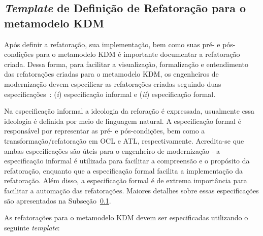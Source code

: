 \subsection{\textit{Template} de Definição de Refatoração para o metamodelo KDM}\label{sec:template_refatoracao}

Após definir a refatoração, sua implementação, bem como suas pré- e pós-condições para o metamodelo KDM é importante documentar a refatoração criada. Dessa forma, para facilitar a visualização, formalização e entendimento das refatorações criadas para o metamodelo KDM, os engenheiros de modernização devem especificar as refatorações criadas seguindo duas especificações~\cite{staron2004implementing}: (\textit{i}) especificação informal e (\textit{ii}) especificação formal. 

Na especificação informal a ideologia da reforação é expressada, usualmente essa ideologia é definida por meio de linguagem natural. A especificação formal é responsável por representar as pré- e pós-condições, bem como a transformação/refatoração em OCL e ATL, respectivamente. Acredita-se que ambas especificações são úteis para o engenheiro de modernização - a especificação informal é utilizada para facilitar a compreensão e o propósito da refatoração, enquanto que a especificação formal facilita a implementação da refatoração. Além disso, a especificação formal é de extrema importância para facilitar a automação das refatorações. Maiores detalhes sobre essas especificações são apresentados na Subseção~\ref{sec:template_refatoracao}.




As refatorações para o metamodelo KDM devem ser especificadas utilizando o seguinte \textit{template}:


